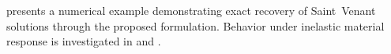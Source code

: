  presents a numerical example demonstrating exact recovery of 
Saint~Venant solutions through the proposed formulation. 
Behavior under inelastic material response is investigated in  and .


















